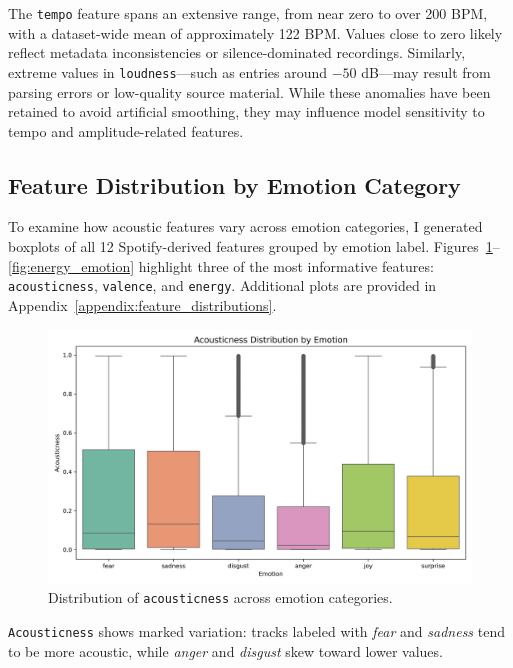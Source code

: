 \documentclass{article}
\begin{document}
The \texttt{tempo} feature spans an extensive range, from near zero to over 200 BPM, with a dataset-wide mean of approximately 122 BPM. Values close to zero likely reflect metadata inconsistencies or silence-dominated recordings. Similarly, extreme values in \texttt{loudness}—such as entries around $-50$ dB—may result from parsing errors or low-quality source material. While these anomalies have been retained to avoid artificial smoothing, they may influence model sensitivity to tempo and amplitude-related features.

\subsection{Feature Distribution by Emotion Category}

To examine how acoustic features vary across emotion categories, I generated boxplots of all 12 Spotify-derived features grouped by emotion label. Figures~\ref{fig:acousticness_emotion}–\ref{fig:energy_emotion} highlight three of the most informative features: \texttt{acousticness}, \texttt{valence}, and \texttt{energy}. Additional plots are provided in Appendix~\ref{appendix:feature_distributions}.

\begin{figure}[H]
\centering
\includegraphics[width=\textwidth]{Graphics/feature_by_emotion/acousticness_by_emotion_boxplot.png}
\caption{Distribution of \texttt{acousticness} across emotion categories.}
\label{fig:acousticness_emotion}
\end{figure}

\texttt{Acousticness} shows marked variation: tracks labeled with \textit{fear} and \textit{sadness} tend to be more acoustic, while \textit{anger} and \textit{disgust} skew toward lower values.
\end{document}
